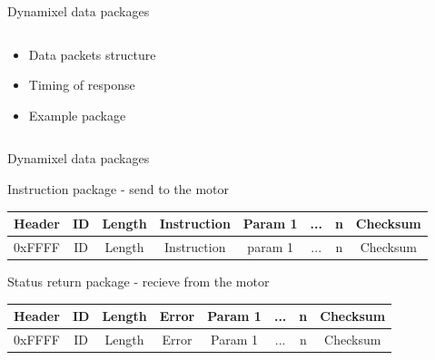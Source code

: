 \documentclass{beamer}
\begin{document}
\begin{frame}{Dynamixel data packages}

    \begin{columns}
        \begin{column}[]{0.5\textwidth}
            \begin{itemize}
                \item Data packets structure
                \item Timing of response
                \item Example package
            \end{itemize}
        \end{column}
        
        
        \begin{column}[]{0.5\textwidth}
        \end{column}
    \end{columns}
    
\end{frame}



\begin{frame}{Dynamixel data packages}

    Instruction package - send to the motor

    \begin{table}
        \begin{tabular}{| c | c | c | c | c | c | c | c |}
            \hline
            Header & ID & Length & Instruction & Param 1 & ... & n & Checksum\\
            \hline
            0xFFFF & ID & Length & Instruction & param 1 & ... & n & Checksum\\
            \hline
        \end{tabular}
    \end{table}
    
    Status return package - recieve from the motor

    \begin{table}
        \begin{tabular}{| c | c | c | c | c | c | c | c |}
            \hline
            Header & ID & Length & Error & Param 1 & ... & n & Checksum\\
            \hline
            0xFFFF & ID & Length & Error & Param 1 & ... & n & Checksum\\
            \hline
        \end{tabular}
    \end{table}
    
\end{frame}
\end{document}
